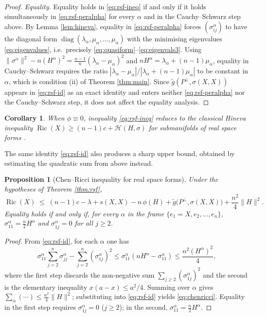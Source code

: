 \documentclass[11pt]{article}
\newtheorem{proposition}[theorem]{Proposition}
\newtheorem{corollary}[theorem]{Corollary}
\theoremstyle{definition}
\newcommand{\tg}{\widetilde{g}}
\newcommand{\Ric}{\operatorname{Ric}}
\newcommand{\HH}{\mathcal{H}}
\begin{document}
\begin{proof}
\emph{Equality.} Equality holds in \eqref{eq:rsf-ineq} if and only if it holds simultaneously in \eqref{eq:rsf-peralpha} for every $\alpha$ and in the Cauchy--Schwarz step above. By Lemma \ref{lem:hineva}, equality in \eqref{eq:rsf-peralpha} forces $(\sigma^\alpha_{ij})$ to have the diagonal form $\operatorname{diag}(\lambda_\alpha,\mu_\alpha,\dots,\mu_\alpha)$ with the minimising eigenvalues \eqref{eq:eigenvalues}, i.e.\ precisely \eqref{eq:quasiform}--\eqref{eq:eigenvals3}. Using $\|\sigma^\alpha\|^2-n(H^\alpha)^2=\frac{n-1}{n}(\lambda_\alpha-\mu_\alpha)^2$ and $nH^\alpha=\lambda_\alpha+(n-1)\mu_\alpha$, equality in Cauchy--Schwarz requires the ratio $|\lambda_\alpha-\mu_\alpha|/|\lambda_\alpha+(n-1)\mu_\alpha|$ to be constant in $\alpha$, which is condition (ii) of Theorem \ref{thm:main}. Since $\tg(P^\perp,\sigma(X,X))$ appears in \eqref{eq:rsf-id} as an exact identity and enters neither \eqref{eq:rsf-peralpha} nor the Cauchy--Schwarz step, it does not affect the equality analysis.
\end{proof}

\begin{corollary}\label{cor:rsf-classical}
When $\phi\equiv0$, inequality \eqref{eq:rsf-ineq} reduces to the classical Hineva inequality $\Ric(X)\ge(n-1)c+\HH(H,\sigma)$ for submanifolds of real space forms \cite{Hineva3}.
\end{corollary}

The same identity \eqref{eq:rsf-id} also produces a sharp upper bound, obtained by estimating the quadratic sum from above instead.

\begin{proposition}[Chen--Ricci inequality for real space forms]\label{prop:chenricci}
Under the hypotheses of Theorem \ref{thm:rsf},
\begin{equation}\label{eq:chenricci}
\Ric(X)\;\le\;(n-1)c-\lambda+s(X,X)-n\,\phi(H)+\tg\bigl(P^\perp,\sigma(X,X)\bigr)+\frac{n^2}{4}\|H\|^2.
\end{equation}
Equality holds if and only if, for every $\alpha$ in the frame $\{e_1=X,e_2,\dots,e_n\}$, $\sigma^\alpha_{11}=\tfrac n2 H^\alpha$ and $\sigma^\alpha_{1j}=0$ for all $j\ge2$.
\end{proposition}
\begin{proof}
From \eqref{eq:rsf-id}, for each $\alpha$ one has
\[
\sigma^\alpha_{11}\sum_{j=2}^{n}\sigma^\alpha_{jj}-\sum_{j=2}^{n}(\sigma^\alpha_{1j})^2\le\sigma^\alpha_{11}(nH^\alpha-\sigma^\alpha_{11})\le\frac{n^2(H^\alpha)^2}{4},
\]
where the first step discards the non-negative sum $\sum_{j\ge2}(\sigma^\alpha_{1j})^2$ and the second is the elementary inequality $x(a-x)\le a^2/4$. Summing over $\alpha$ gives $\sum_\alpha(\cdots)\le\frac{n^2}{4}\|H\|^2$; substituting into \eqref{eq:rsf-id} yields \eqref{eq:chenricci}. Equality in the first step requires $\sigma^\alpha_{1j}=0$ ($j\ge2$); in the second, $\sigma^\alpha_{11}=\tfrac n2 H^\alpha$.
\end{proof}
\end{document}
